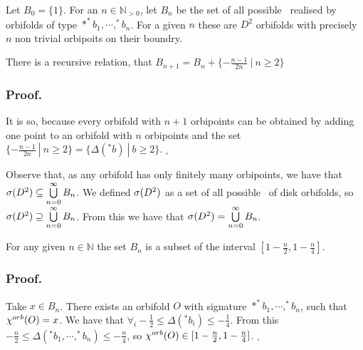 \begin{definition} 
Let $B_0 = \{1\}$.
For an $n \in \mathbb{N}_{>0}$, let $B_n$ be the set of all possible \Eoc\ realised 
by orbifolds of type 
$*^*b_1, \cdots, ^*b_n$. For a given $n$ these are 
$D^2$ orbifolds with precisely $n$ non trivial orbipoits on their boundry.
\end{definition}


\begin{observation}\label{recursive_relation}
There is a recursive relation, that $B_{n+1}=B_n+\{-\frac{n-1}{2n}\ |\ n\geq 2\}$
\end{observation}
\subsubsection{Proof.}
It is so, because every orbifold with $n+1$ orbipoints can be obtained by adding one point 
to an orbifold with $n$ orbipoints and the set 
$\{-\frac{n-1}{2n}\ |\ n\geq 2\} = \{\Delta(^\ast b)\ |\ b \geq 2\}$. $_\square$


\begin{observation}\label{form_of_a_spectrum}
Observe that, as any orbifold has only finitely many orbipoints, we have that ${{\sigma}(D^2)} \subseteq 
\bigcup\limits^\infty_{n=0}B_n $. We defined ${{\sigma}(D^2)}$ as a set of all possible \Eoc\ of disk 
orbifolds, so ${{\sigma}(D^2)} \supseteq 
\bigcup\limits^\infty_{n=0}B_n $. From this we have that ${{\sigma}(D^2)} = \bigcup\limits^\infty_{n=0}B_n$.
\end{observation}

\begin{lemma}\label{fixed_number_of_orbipoints}
For any given $n \in \mathbb{N}$ the set $B_n$ is a subset of the interval 
$[1-\frac{n}{2}, 1-\frac{n}{4}]$.
\end{lemma}
\subsubsection{Proof.}
Take $x \in B_n$. There exists an orbifold $O$ with signature $\ast ^*b_1, \cdots, ^*b_n$, 
such that ${\chi^{orb}(O)} = x$. We have that $\forall_i -\frac{1}{2} \leq \Delta(^*b_i) \leq 
-\frac{1}{4}$. From this $-\frac{n}{2} \leq \Delta(^*b_1, \cdots, ^*b_n) \leq -\frac{n}{4}$, 
so ${\chi^{orb}(O)} \in [1-\frac{n}{2}, 1-\frac{n}{4}]$. $_\square$

